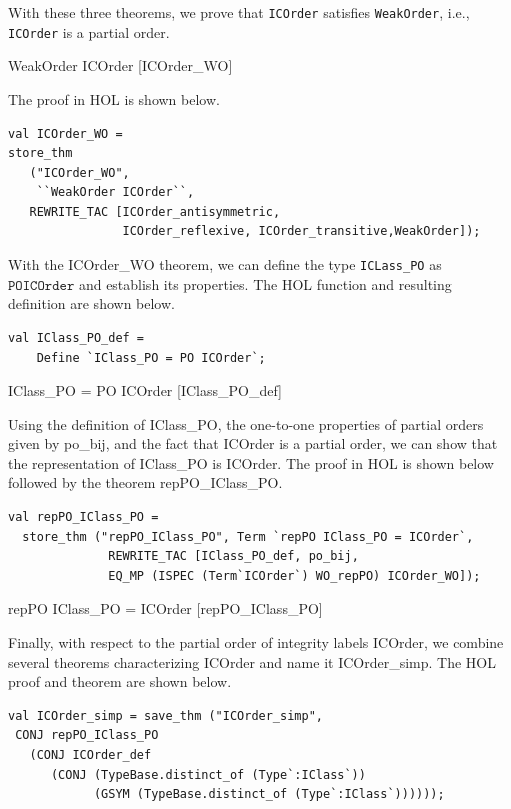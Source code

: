 With these three theorems, we prove that \texttt{ICOrder} satisfies
\texttt{WeakOrder}, i.e., \texttt{ICOrder} is a partial order.

\HOLTokenTurnstile{} WeakOrder ICOrder \hfill{[ICOrder\_WO]}

The proof in HOL is shown below.

\begin{session}
\begin{verbatim}
val ICOrder_WO =
store_thm
   ("ICOrder_WO",
    ``WeakOrder ICOrder``,
   REWRITE_TAC [ICOrder_antisymmetric,
                ICOrder_reflexive, ICOrder_transitive,WeakOrder]);
\end{verbatim}
\end{session}

With the ICOrder\_WO theorem, we can define the type \texttt{ICLass\_PO} as $\mathtt{PO ICOrder}$ and establish its properties. The HOL function and resulting definition are shown below.

\begin{session}
\begin{verbatim}
val IClass_PO_def =
    Define `IClass_PO = PO ICOrder`;
\end{verbatim}
\end{session}

\HOLTokenTurnstile{} IClass_PO = PO ICOrder \hfill{[IClass\_PO\_def]}

Using the definition of IClass\_PO, the one-to-one properties of partial orders given by po\_bij, and the fact that ICOrder is a partial order, we can show that the representation of IClass\_PO is ICOrder.  The proof in HOL is shown below followed by the theorem repPO\_IClass\_PO.
\begin{session}
\begin{verbatim}
val repPO_IClass_PO = 
  store_thm ("repPO_IClass_PO", Term `repPO IClass_PO = ICOrder`,
              REWRITE_TAC [IClass_PO_def, po_bij,
              EQ_MP (ISPEC (Term`ICOrder`) WO_repPO) ICOrder_WO]);
\end{verbatim}
\end{session}

\HOLTokenTurnstile{} repPO IClass_PO = ICOrder \hfill{[repPO\_IClass\_PO]}


Finally, with respect to the partial order of integrity labels
ICOrder, we combine several theorems characterizing ICOrder and name
it ICOrder\_simp. The HOL proof and theorem are shown below.
\begin{session}
\begin{verbatim}
val ICOrder_simp = save_thm ("ICOrder_simp",
 CONJ repPO_IClass_PO 
   (CONJ ICOrder_def
      (CONJ (TypeBase.distinct_of (Type`:IClass`))
            (GSYM (TypeBase.distinct_of (Type`:IClass`))))));
\end{verbatim}
\end{session}

